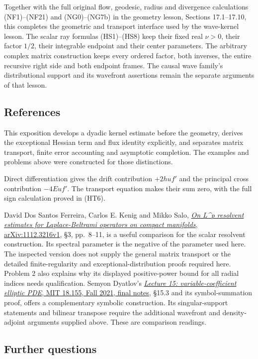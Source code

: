 \documentclass[
  11pt,
]{article}
\begin{document}
Together with the full original flow, geodesic, radius and divergence
calculations (NF1)--(NF21) and (NG0)--(NG7b) in the geometry lesson,
Sections 17.1--17.10, this completes the geometric and transport
interface used by the wave-kernel lesson. The scalar ray formulas
(HS1)--(HS8) keep their fixed real \(\nu>0\), their factor \(1/2\),
their integrable endpoint and their center parameters. The arbitrary
complex matrix construction keeps every ordered factor, both inverses,
the entire recursive right side and both endpoint frames. The causal
wave family's distributional support and its wavefront assertions remain
the separate arguments of that lesson.

\subsection{References}\label{references}

This exposition develops a dyadic kernel estimate before the geometry,
derives the exceptional Hessian term and flux identity explicitly, and
separates matrix transport, finite error accounting and asymptotic
completion. The examples and problems above were constructed for those
distinctions.

Direct differentiation gives the drift contribution \(+2hu f'\) and the
principal cross contribution \(-4Eu f'\). The transport equation makes
their sum zero, with the full sign calculation proved in (HT6).

David Dos Santos Ferreira, Carlos E. Kenig and Mikko Salo,
\href{https://arxiv.org/abs/1112.3216v1}{\emph{On L\^{}p resolvent
estimates for Laplace-Beltrami operators on compact manifolds},
arXiv:1112.3216v1}, §3, pp.~8--11, is a useful comparison for the scalar
resolvent construction. Its spectral parameter is the negative of the
parameter used here. The inspected version does not supply the general
matrix transport or the detailed finite-regularity and
exceptional-distribution proofs required here. Problem 2 also explains
why its displayed positive-power bound for all radial indices needs
qualification. Semyon Dyatlov's
\href{https://math.mit.edu/~dyatlov/18.155-F21/Lecture15.pdf}{\emph{Lecture
15: variable-coefficient elliptic PDE}, MIT 18.155, Fall 2021, final
notes}, §15.3 and its symbol-summation proof, offers a complementary
symbolic construction. Its singular-support statements and bilinear
transpose require the additional wavefront and density-adjoint arguments
supplied above. These are comparison readings.

\subsection{Further questions}\label{further-questions}
\end{document}
